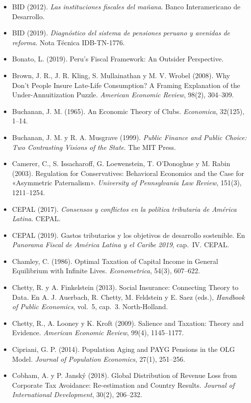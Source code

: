 \documentclass[11pt,a4paper]{article}
\begin{document}
{\begin{itemize}[leftmargin=1.4em,itemsep=1pt,label={}]
\item BID (2012). \emph{Las instituciones fiscales del mañana}. Banco Interamericano de Desarrollo.
\item BID (2019). \emph{Diagnóstico del sistema de pensiones peruano y avenidas de reforma}. Nota Técnica IDB-TN-1776.
\item Bonato, L. (2019). Peru's Fiscal Framework: An Outsider Perspective.
\item Brown, J. R., J. R. Kling, S. Mullainathan y M. V. Wrobel (2008). Why Don't People Insure Late-Life Consumption? A Framing Explanation of the Under-Annuitization Puzzle. \emph{American Economic Review}, 98(2), 304--309.
\item Buchanan, J. M. (1965). An Economic Theory of Clubs. \emph{Economica}, 32(125), 1--14.
\item Buchanan, J. M. y R. A. Musgrave (1999). \emph{Public Finance and Public Choice: Two Contrasting Visions of the State}. The MIT Press.
\item Camerer, C., S. Issacharoff, G. Loewenstein, T. O'Donoghue y M. Rabin (2003). Regulation for Conservatives: Behavioral Economics and the Case for «Asymmetric Paternalism». \emph{University of Pennsylvania Law Review}, 151(3), 1211--1254.
\item CEPAL (2017). \emph{Consensos y conflictos en la política tributaria de América Latina}. CEPAL.
\item CEPAL (2019). Gastos tributarios y los objetivos de desarrollo sostenible. En \emph{Panorama Fiscal de América Latina y el Caribe 2019}, cap.~IV. CEPAL.
\item Chamley, C. (1986). Optimal Taxation of Capital Income in General Equilibrium with Infinite Lives. \emph{Econometrica}, 54(3), 607--622.
\item Chetty, R. y A. Finkelstein (2013). Social Insurance: Connecting Theory to Data. En A. J. Auerbach, R. Chetty, M. Feldstein y E. Saez (eds.), \emph{Handbook of Public Economics}, vol.~5, cap.~3. North-Holland.
\item Chetty, R., A. Looney y K. Kroft (2009). Salience and Taxation: Theory and Evidence. \emph{American Economic Review}, 99(4), 1145--1177.
\item Cipriani, G. P. (2014). Population Aging and PAYG Pensions in the OLG Model. \emph{Journal of Population Economics}, 27(1), 251--256.
\item Cobham, A. y P. Janský (2018). Global Distribution of Revenue Loss from Corporate Tax Avoidance: Re-estimation and Country Results. \emph{Journal of International Development}, 30(2), 206--232.

\end{itemize}}
\end{document}
